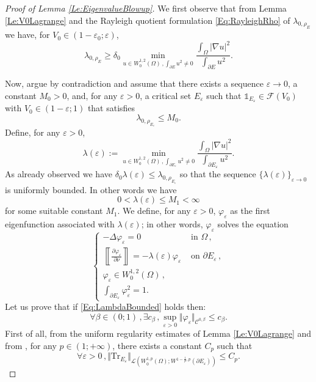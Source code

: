 \documentclass{article}
\renewcommand{\geq}{\geqslant}
\renewcommand{\leq}{\leqslant}
\def\e{{\varepsilon}}
\def\O{{\Omega}}
\def\n{{\nabla}}
\def\p{{\varphi}}
\numberwithin{equation}{section}
\begin{document}
\begin{proof}[Proof of Lemma \ref{Le:EigenvalueBlowup}]
We first observe that from Lemma \ref{Le:V0Lagrange} and the Rayleigh quotient formulation \eqref{Eq:RayleighRho} of $\lambda_{0,\rho_E}$  we have, for $V_0\in (1-\e_0;\e)$,
\[\lambda_{0,\rho_E}\geq  \delta_0\min_{u\in W^{1,2}_0(\O)\,, \int_{\partial E}u^2\neq 0}\frac{\int_\O |\n u|^2}{\int_{\partial E} u^2}.
\]

Now, argue by contradiction and assume  that there exists a sequence $\e\to0$, a constant $M_0>0$, and, for any $\e>0$, a critical set $E_\e$ such that $\mathds 1_{E_\e}\in \mathcal F(V_0)$ with $V_0\in (1-\e;1)$ that satisfies 
\[ \lambda_{0,\rho_{E_\e}}\leq M_0.\] Define, for any $\e>0$, 
\[ \lambda(\e):=\min_{u\in W^{1,2}_0(\O)\,, \int_{\partial E_\e}u^2\neq 0}\frac{\int_\O |\n u|^2}{\int_{\partial E_\e} u^2}.\] As already observed we have $\delta_0\lambda(\e)\leq \lambda_{0,\rho_{E_\e}}$ so that the sequence $\{\lambda(\e)\}_{\e \to 0}$ is uniformly bounded. In other words we have 
\begin{equation}\label{Eq:LambdaBounded} 0<\lambda(\e)\leq M_1<\infty\end{equation} for some suitable constant $M_1$. We define, for any $\e>0$, $\p_\e$ as the first eigenfunction associated with $\lambda(\e)$; in other words, $\p_\e$ solves the equation 
\begin{equation}\label{Eq:PhiEpsilon}
\begin{cases}
-\Delta \p_\e=0&\text{ in }\O\,, 
\\ \left\llbracket \frac{\partial \p_\e}{\partial \nu}\right\rrbracket=-\lambda(\e)\p_\e&\text{ on }\partial E_\e\,, 
\\ \p_\e\in W^{1,2}_0(\O)\,, 
\\ \int_{\partial E_\e} \p_\e^2=1.
\end{cases}
\end{equation}
Let us prove that if \eqref{Eq:LambdaBounded} holds then:
\begin{equation}\label{Eq:PhiEpsilonHolder}
\forall \beta \in (0;1)\,, \exists c_\beta\,, \sup_{\e>0}\Vert \p_\e\Vert_{\mathscr C^{0,\beta}}\leq c_\beta.
\end{equation}
First of all, from the uniform regularity estimates of Lemma \ref{Le:V0Lagrange} and from \cite[Theorem 18.34]{Leoni}, for any $p\in (1;+\infty)$, there exists a constant $C_p$ such that 
\[ \forall \e>0\,, \Vert \mathrm{Tr}_{E_\e}\Vert_{\mathcal L(W^{1,p}_0(\O);W^{1-\frac1p,p}(\partial E_\e))}\leq C_p.\] 


\end{proof}
\end{document}
